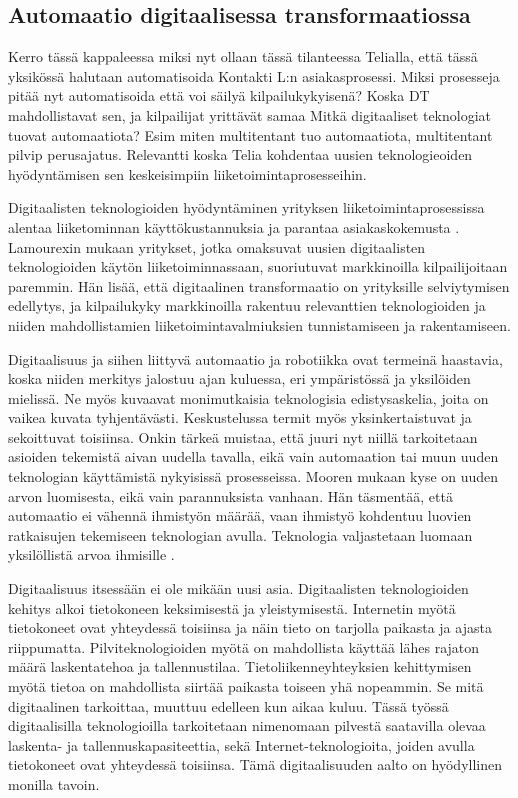 \documentclass[finnish,12pt,a4paper,pdftex]{article}
\begin{document}
\subsection{Automaatio digitaalisessa transformaatiossa}
Kerro tässä kappaleessa miksi nyt ollaan tässä tilanteessa Telialla, että tässä yksikössä halutaan automatisoida Kontakti L:n asiakasprosessi. Miksi prosesseja pitää nyt automatisoida että voi säilyä kilpailukykyisenä? Koska DT mahdollistavat sen, ja kilpailijat yrittävät samaa
Mitkä digitaaliset teknologiat tuovat automaatiota? Esim miten multitentant tuo automaatiota, multitentant pilvip perusajatus. Relevantti koska Telia kohdentaa uusien teknologieoiden hyödyntämisen sen keskeisimpiin liiketoimintaprosesseihin.

Digitaalisten teknologioiden hyödyntäminen yrityksen liiketoimintaprosessissa alentaa liiketominnan käyttökustannuksia ja parantaa asiakaskokemusta  \citep{lamoureux, jungner}. Lamourexin mukaan yritykset, jotka omaksuvat uusien digitaalisten teknologioiden käytön liiketoiminnassaan, suoriutuvat markkinoilla kilpailijoitaan paremmin. Hän lisää, että digitaalinen transformaatio on yrityksille selviytymisen edellytys, ja kilpailukyky markkinoilla rakentuu relevanttien teknologioiden ja niiden mahdollistamien liiketoimintavalmiuksien tunnistamiseen ja rakentamiseen. 

Digitaalisuus ja siihen liittyvä automaatio ja robotiikka ovat termeinä haastavia, koska niiden merkitys jalostuu ajan kuluessa, eri ympäristössä ja yksilöiden mielissä. Ne myös kuvaavat monimutkaisia teknologisia edistysaskelia, joita on vaikea kuvata tyhjentävästi. Keskustelussa termit myös yksinkertaistuvat ja sekoittuvat toisiinsa. Onkin tärkeä muistaa, että juuri nyt niillä tarkoitetaan asioiden tekemistä aivan uudella tavalla, eikä vain automaation tai muun uuden teknologian käyttämistä nykyisissä prosesseissa. Mooren \citeyearpar{susanmoore} mukaan kyse on uuden arvon luomisesta, eikä vain parannuksista vanhaan. Hän täsmentää, että automaatio ei vähennä ihmistyön määrää, vaan ihmistyö kohdentuu luovien ratkaisujen tekemiseen teknologian avulla. Teknologia valjastetaan luomaan yksilöllistä arvoa ihmisille \citep{jungner, susanmoore}.

Digitaalisuus itsessään ei ole mikään uusi asia. Digitaalisten teknologioiden kehitys alkoi tietokoneen keksimisestä ja yleistymisestä. Internetin myötä tietokoneet ovat yhteydessä toisiinsa ja näin tieto on tarjolla paikasta ja ajasta riippumatta. Pilviteknologioiden myötä on mahdollista käyttää lähes rajaton määrä laskentatehoa ja tallennustilaa. Tietoliikenneyhteyksien kehittymisen myötä tietoa on mahdollista siirtää paikasta toiseen yhä nopeammin. Se mitä digitaalinen tarkoittaa, muuttuu edelleen kun aikaa kuluu. Tässä työssä digitaalisilla teknologioilla tarkoitetaan nimenomaan pilvestä saatavilla olevaa laskenta- ja tallennuskapasiteettia, sekä Internet-teknologioita, joiden avulla tietokoneet ovat yhteydessä toisiinsa. Tämä digitaalisuuden aalto on hyödyllinen monilla tavoin. 
\end{document}
